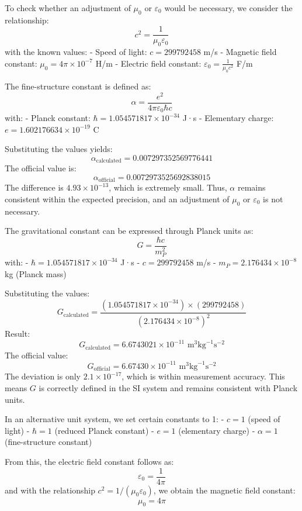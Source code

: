 \documentclass{article}
\begin{document}
	To check whether an adjustment of $\mu_0$ or $\varepsilon_0$ would be necessary, we consider the relationship:
	\[
	c^2 = \frac{1}{\mu_0 \varepsilon_0}
	\]
	with the known values:
	- Speed of light: \( c = 299792458 \) m/s
	- Magnetic field constant: \( \mu_0 = 4\pi \times 10^{-7} \) H/m
	- Electric field constant: \( \varepsilon_0 = \frac{1}{\mu_0 c^2} \) F/m
	
	The fine-structure constant is defined as:
	\[
	\alpha = \frac{e^2}{4\pi \varepsilon_0 \hbar c}
	\]
	with:
	- Planck constant: \( \hbar = 1.054571817 \times 10^{-34} \) J·s
	- Elementary charge: \( e = 1.602176634 \times 10^{-19} \) C
	
	Substituting the values yields:
	\[
	\alpha_{\text{calculated}} = 0.007297352569776441
	\]
	The official value is:
	\[
	\alpha_{\text{official}} = 0.0072973525692838015
	\]
	The difference is \( 4.93 \times 10^{-13} \), which is extremely small. Thus, \( \alpha \) remains consistent within the expected precision, and an adjustment of \( \mu_0 \) or \( \varepsilon_0 \) is not necessary.
	
	The gravitational constant can be expressed through Planck units as:
	\[
	G = \frac{\hbar c}{m_P^2}
	\]
	with:
	- \( \hbar = 1.054571817 \times 10^{-34} \) J·s
	- \( c = 299792458 \) m/s
	- \( m_P = 2.176434 \times 10^{-8} \) kg (Planck mass)
	
	Substituting the values:
	\[
	G_{\text{calculated}} = \frac{(1.054571817 \times 10^{-34}) \times (299792458)}{(2.176434 \times 10^{-8})^2}
	\]
	Result:
	\[
	G_{\text{calculated}} = 6.6743021 \times 10^{-11} \text{ m}^3\text{kg}^{-1}\text{s}^{-2}
	\]
	The official value:
	\[
	G_{\text{official}} = 6.67430 \times 10^{-11} \text{ m}^3\text{kg}^{-1}\text{s}^{-2}
	\]
	The deviation is only \( 2.1 \times 10^{-17} \), which is within measurement accuracy. This means \( G \) is correctly defined in the SI system and remains consistent with Planck units.
	
	In an alternative unit system, we set certain constants to 1:
	- \( c = 1 \) (speed of light)
	- \( \hbar = 1 \) (reduced Planck constant)
	- \( e = 1 \) (elementary charge)
	- \( \alpha = 1 \) (fine-structure constant)
	
	From this, the electric field constant follows as:
	\[
	\varepsilon_0 = \frac{1}{4\pi}
	\]
	and with the relationship \( c^2 = 1/(\mu_0 \varepsilon_0) \), we obtain the magnetic field constant:
	\[
	\mu_0 = 4\pi
	\]
	
\end{document}
